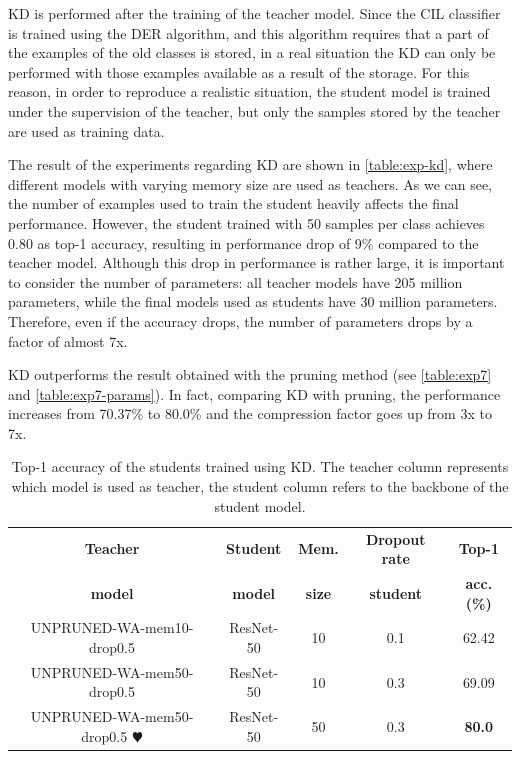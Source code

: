 KD is performed after the training of the teacher model. Since the CIL classifier is trained using the DER algorithm, and this algorithm requires that a part of the examples of the old classes is stored, in a real situation the KD can only be performed with those examples available as a result of the storage. For this reason, in order to reproduce a realistic situation, the student model is trained under the supervision of the teacher, but only the samples stored by the teacher are used as training data.

The result of the experiments regarding KD are shown in \autoref{table:exp-kd}, where different models with varying memory size are used as teachers. As we can see, the number of examples used to train the student heavily affects the final performance.
However, the student trained with 50 samples per class achieves 0.80 as top-1 accuracy, resulting in performance drop of 9\% compared to the teacher model. Although this drop in performance is rather large, it is important to consider the number of parameters: all teacher models have 205 million parameters, while the final models used as students have 30 million parameters.
Therefore, even if the accuracy drops, the number of parameters drops by a factor of almost 7x.

KD outperforms the result obtained with the pruning method (see \autoref{table:exp7} and \autoref{table:exp7-params}). In fact, comparing KD with pruning, the performance increases from 70.37\% to 80.0\% and the compression factor goes up from 3x to 7x.


\begin{table}[H]
    \centering
    \begin{tabular}{c|c|c|c|c}
        \hline
        \textbf{Teacher} &
        \textbf{Student} &
        \textbf{Mem.} &
        \textbf{Dropout rate} &
        \textbf{Top-1} \\
        \textbf{model} &
        \textbf{model} &
        \textbf{size} &
        \textbf{student} &
        \textbf{acc. (\%)} \\
        \hline
        \hline
UNPRUNED-WA-mem10-drop0.5&ResNet-50&10&0.1&62.42\\
UNPRUNED-WA-mem50-drop0.5&ResNet-50&10&0.3&69.09\\
UNPRUNED-WA-mem50-drop0.5 $\varheartsuit$&ResNet-50&50&0.3&\textbf{80.0}\\
\hline
\end{tabular}
\caption{Top-1 accuracy of the students trained using KD. The teacher column represents which model is used as teacher, the student column refers to the backbone of the student model. }
    \label{table:exp-kd}
\end{table}



